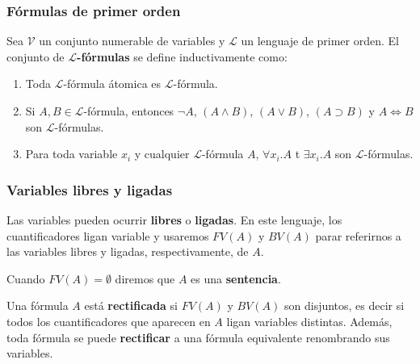 \subsubsection{Fórmulas de primer orden}
Sea $\mathcal{V}$ un conjunto numerable de variables y $\mathcal{L}$ un lenguaje de primer orden. El conjunto de \textbf{$\mathcal{L}$-fórmulas} se define inductivamente como:
\begin{enumerate}
\item Toda $\mathcal{L}$-fórmula átomica es $\mathcal{L}$-fórmula.
\item Si $A,B\in \mathcal{L}$-fórmula, entonces $\lnot A$, $(A\land B)$, $(A\lor B)$, $(A\supset B)$ y $A\iff B$ son $\mathcal{L}$-fórmulas.
\item Para toda variable $x_i$ y cualquier $\mathcal{L}$-fórmula $A$, $\forall x_i.A$ t $\exists x_i.A$ son $\mathcal{L}$-fórmulas.

\end{enumerate}
\subsubsection*{Variables libres y ligadas}

Las variables pueden ocurrir \textbf{libres} o \textbf{ligadas}. En este lenguaje, los cuantificadores ligan variable y usaremos $FV(A)$ y $BV(A)$ parar referirnos a las variables libres y ligadas, respectivamente, de $A$.

Cuando $FV(A) = \emptyset$ diremos que $A$ es una \textbf{sentencia}.

Una fórmula $A$ está \textbf{rectificada} si $FV(A)$ y $BV(A)$ son disjuntos, es decir si todos los cuantificadores que aparecen en $A$ ligan variables distintas. Además, toda fórmula se puede \textbf{rectificar} a una fórmula equivalente renombrando sus variables.

